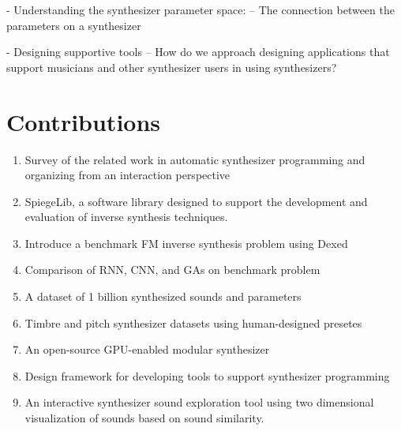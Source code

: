 - Understanding the synthesizer parameter space:
-- The connection between the parameters on a synthesizer 

- Designing supportive tools
-- How do we approach designing applications that support musicians and other synthesizer users in using synthesizers?

\section{Contributions}
\begin{enumerate}
    \item Survey of the related work in automatic synthesizer programming and organizing from an interaction perspective
    \item SpiegeLib, a software library designed to support the development and evaluation of inverse synthesis techniques.
    \item Introduce a benchmark FM inverse synthesis problem using Dexed
    \item Comparison of RNN, CNN, and GAs on benchmark problem
    \item A dataset of 1 billion synthesized sounds and parameters
    \item Timbre and pitch synthesizer datasets using human-designed presetes
    \item An open-source GPU-enabled modular synthesizer
    \item Design framework for developing tools to support synthesizer programming
    \item An interactive synthesizer sound exploration tool using two dimensional visualization of sounds based on sound similarity.
\end{enumerate}

